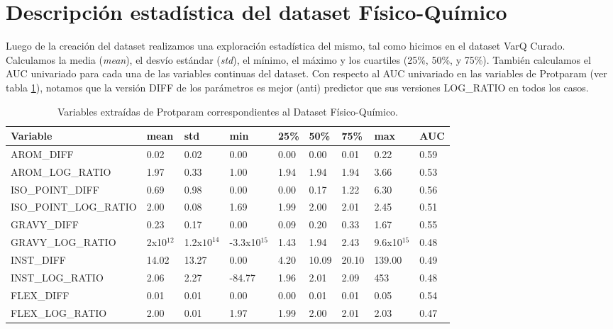 \section{Descripción estadística del dataset Físico-Químico}

Luego de la creación del dataset realizamos una exploración estadística del mismo, tal como hicimos en el dataset VarQ Curado. Calculamos la media (\textit{mean}), el desvío estándar (\textit{std}), el mínimo, el máximo y los cuartiles (25\%, 50\%, y 75\%). También calculamos el AUC univariado para cada una de las variables continuas del dataset. Con respecto al AUC univariado en las variables de Protparam (ver tabla \ref{tab:protparam_vars}), notamos que la versión DIFF de los parámetros es mejor (anti) predictor que sus versiones LOG\_RATIO en todos los casos.


\begin{table}[H]
\centering
\begin{tabular}{|l|l|l|l|l|l|l|l|l|}
\hline
Variable & mean & std & min & 25\% & 50\%  & 75\% & max & AUC \\ \hline
AROM\_DIFF  & 0.02  & 0.02  & 0.00 & 0.00 & 0.00  & 0.01 & 0.22  & 0.59 \\ \hline
AROM\_LOG\_RATIO & 1.97 & 0.33 & 1.00 & 1.94 & 1.94  & 1.94 & 3.66  & 0.53 \\ \hline
ISO\_POINT\_DIFF & 0.69  & 0.98 & 0.00  & 0.00 & 0.17  & 1.22 & 6.30  & 0.56 \\ \hline
ISO\_POINT\_LOG\_RATIO & 2.00 & 0.08 & 1.69 & 1.99 & 2.00  & 2.01 & 2.45  & 0.51 \\ \hline
GRAVY\_DIFF & 0.23 & 0.17 & 0.00 & 0.09 & 0.20  & 0.33 & 1.67  & 0.55 \\ \hline
GRAVY\_LOG\_RATIO & 2x10$^{12}$ & 1.2x$10^{14}$ & -3.3x10$^{15}$ & 1.43 & 1.94 & 2.43 & 9.6x10$^{15}$ & 0.48 \\\hline
INST\_DIFF & 14.02 & 13.27 & 0.00 & 4.20 & 10.09 & 20.10 & 139.00 & 0.49 \\ \hline
INST\_LOG\_RATIO & 2.06 & 2.27 & -84.77 & 1.96 & 2.01  & 2.09 & 453 & 0.48 \\ \hline
FLEX\_DIFF & 0.01 & 0.01 & 0.00 & 0.00 & 0.01  & 0.01  & 0.05 & 0.54 \\ \hline
FLEX\_LOG\_RATIO & 2.00 & 0.01 & 1.97 & 1.99 & 2.00  & 2.01  & 2.03 & 0.47 \\ \hline
\end{tabular}
\caption{Variables extraídas de Protparam correspondientes al Dataset Físico-Químico.}
\label{tab:protparam_vars}
\end{table}


